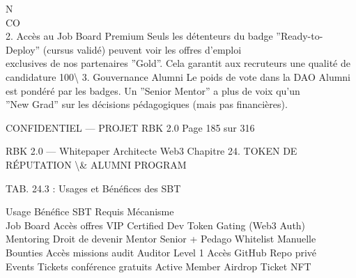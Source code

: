 \documentclass[12pt,landscape,a4paper]{article}
\newenvironment{confidential}
{\begin{tcolorbox}[
    colback=rbkred!5!white,
    colframe=rbkred!75!black,
    title=CONFIDENTIEL,
    fonttitle=\bfseries\color{white},
    coltitle=rbkred!75!black,
    breakable,
    enhanced,
    frame hidden,
    borderline west={2pt}{0pt}{rbkred!75!black}
]}
{\end{tcolorbox}}
\begin{document}
\vspace{0.5em}
N\\
CO\\
2. Accès au Job Board Premium Seuls les détenteurs du badge ”Ready-to-Deploy” (cursus validé) peuvent voir les offres d’emploi\\
exclusives de nos partenaires ”Gold”. Cela garantit aux recruteurs une qualité de candidature 100\textbackslash{}%
\vspace{0.5em}
3. Gouvernance Alumni Le poids de vote dans la DAO Alumni est pondéré par les badges. Un ”Senior Mentor” a plus de voix qu’un\\
”New Grad” sur les décisions pédagogiques (mais pas financières).\\
\vspace{0.5em}
\vspace{0.5em}
\vspace{0.5em}
\vspace{0.5em}
\begin{confidential}CONFIDENTIEL — PROJET RBK 2.0                                Page 185 sur 316\end{confidential}
RBK 2.0 — Whitepaper Architecte Web3                                            Chapitre 24. TOKEN DE RÉPUTATION \textbackslash{}& ALUMNI PROGRAM\\
\vspace{0.5em}
\vspace{0.5em}
\begin{center}\begin{tabular}TAB. 24.3 : Usages et Bénéfices des SBT\end{tabular}\end{center}
\vspace{0.5em}
\vspace{0.5em}
Usage     Bénéfice                    SBT Requis      Mécanisme\\
Job Board Accès offres VIP            Certified Dev   Token Gating (Web3 Auth)\\
Mentoring Droit de devenir Mentor     Senior + Pedago Whitelist Manuelle\\
Bounties Accès missions audit         Auditor Level 1 Accès GitHub Repo privé\\
Events    Tickets conférence gratuits Active Member Airdrop Ticket NFT\\
\vspace{0.5em}
\vspace{0.5em}
\vspace{0.5em}
\vspace{0.5em}
\end{document}
